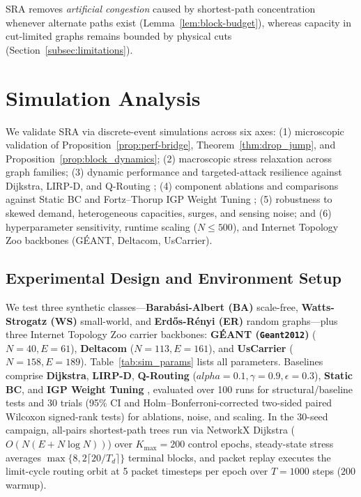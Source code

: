 \documentclass{ccjnl}
\newcommand{\rev}[1]{#1}
\def\rev#1{#1}%
\def\alpha{alpha}%
\begin{document}
\begin{remark}
SRA removes \textit{artificial congestion} caused by shortest-path concentration whenever alternate paths exist (Lemma~\ref{lem:block-budget}), whereas capacity in cut-limited graphs remains bounded by physical cuts (Section~\ref{subsec:limitations}).
\end{remark}

\section{Simulation Analysis}
\label{sec:simulation}

We validate SRA via discrete-event simulations across six axes: (1) microscopic validation of Proposition~\ref{prop:perf-bridge}, Theorem~\ref{thm:drop_jump}, and Proposition~\ref{prop:block_dynamics}; (2) macroscopic stress relaxation across graph families; (3) dynamic performance and targeted-attack resilience against Dijkstra, LIRP-D, and Q-Routing \cite{Dou2020QLearningRouting}; \rev{(4) component ablations and comparisons against Static BC and Fortz--Thorup IGP Weight Tuning \cite{Fortz2000OSPF}; (5) robustness to skewed demand, heterogeneous capacities, surges, and sensing noise; and (6) hyperparameter sensitivity, runtime scaling ($N \le 500$), and Internet Topology Zoo backbones \cite{Knight2011TopologyZoo} (G\'EANT, Deltacom, UsCarrier).}

\subsection{Experimental Design and Environment Setup}
\label{subsec:sim_setup}

We test three synthetic classes—\textbf{Barabási-Albert (BA)} scale-free, \textbf{Watts-Strogatz (WS)} small-world, and \textbf{Erd\H{o}s-Rényi (ER)} random graphs—\rev{plus three Internet Topology Zoo \cite{Knight2011TopologyZoo} carrier backbones: \textbf{G\'EANT (\texttt{Geant2012})} ($N=40, E=61$), \textbf{Deltacom} ($N=113, E=161$), and \textbf{UsCarrier} ($N=158, E=189$)}. Table~\ref{tab:sim_params} lists all parameters. Baselines comprise \textbf{Dijkstra}, \textbf{LIRP-D}, \textbf{Q-Routing} \cite{Dou2020QLearningRouting} ($\alpha=0.1, \gamma=0.9, \epsilon=0.3$), \rev{\textbf{Static BC}, and \textbf{IGP Weight Tuning} \cite{Fortz2000OSPF}}, evaluated over 100 runs for structural/baseline tests and \rev{30 trials (95\% CI and Holm--Bonferroni-corrected two-sided paired Wilcoxon signed-rank tests) for ablations, noise, and scaling. In the 30-seed campaign, all-pairs shortest-path trees run via NetworkX Dijkstra ($O(N(E+N\log N))$) over $K_{\max}=200$ control epochs, steady-state stress averages $\max\{8, 2\lceil 20/T_d\rceil\}$ terminal blocks, and packet replay executes the limit-cycle routing orbit at 5 packet timesteps per epoch over $T=1000$ steps ($200$ warmup).}
\end{document}
